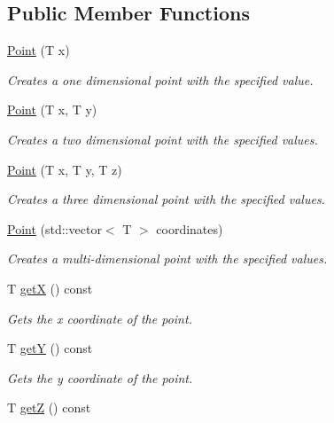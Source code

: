 \subsection*{Public Member Functions}
\begin{DoxyCompactItemize}
\item 
\hyperlink{classrepast_1_1_point_ab873dcd5fc9b62c27f9f75a602077d0b}{Point} (T x)
\begin{DoxyCompactList}\small\item\em Creates a one dimensional point with the specified value. \end{DoxyCompactList}\item 
\hyperlink{classrepast_1_1_point_abed6f095fe52bf4c72b3142563db9bc7}{Point} (T x, T y)
\begin{DoxyCompactList}\small\item\em Creates a two dimensional point with the specified values. \end{DoxyCompactList}\item 
\hyperlink{classrepast_1_1_point_a05d9583817d89b4347ab7d764212a1b1}{Point} (T x, T y, T z)
\begin{DoxyCompactList}\small\item\em Creates a three dimensional point with the specified values. \end{DoxyCompactList}\item 
\hyperlink{classrepast_1_1_point_a9dadb20bf3ca390851a8df68850d2be5}{Point} (std\-::vector$<$ T $>$ coordinates)
\begin{DoxyCompactList}\small\item\em Creates a multi-\/dimensional point with the specified values. \end{DoxyCompactList}\item 
T \hyperlink{classrepast_1_1_point_af985d58e3c8ccd00e54dd46fc71b41b2}{get\-X} () const 
\begin{DoxyCompactList}\small\item\em Gets the x coordinate of the point. \end{DoxyCompactList}\item 
T \hyperlink{classrepast_1_1_point_ac4c09bef3c9be3b69432da55da2c7c57}{get\-Y} () const 
\begin{DoxyCompactList}\small\item\em Gets the y coordinate of the point. \end{DoxyCompactList}\item 
T \hyperlink{classrepast_1_1_point_a2abcd532878f05b30961306b790664e3}{get\-Z} () const 

\end{DoxyCompactItemize}
